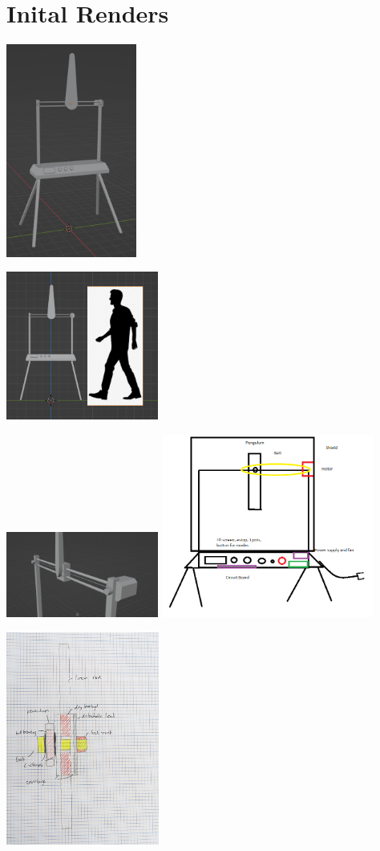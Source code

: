 \documentclass{article}
\begin{document}
\pagebreak
\section{Inital Renders}
\includegraphics[height=7cm]{Full}

\vspace{1cm}

\includegraphics[width=5cm]{Scale}

\includegraphics[width=5cm]{UpperAssy}
\includegraphics[width=7cm]{../../Notes/Sketches/Basic Mock-Up Sketch.png}

\vspace{1cm}
\includegraphics[height=7cm]{../../Notes/Sketches/BearingStackup.jpg}
\end{document}
